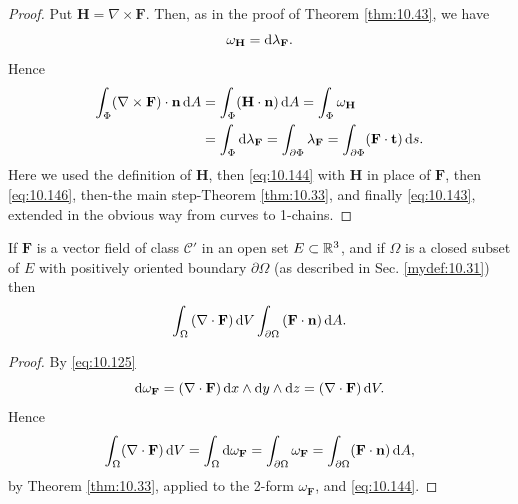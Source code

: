 \begin{proof}
    Put $\mathbf{H} = \nabla \times \mathbf{F}$.
    Then, as in the proof of Theorem \ref{thm:10.43},
    we have 
    \begin{equation}
        \label{eq:10.146}
        \omega_{\mathbf{H}} = \d \lambda_{\mathbf{F}} . 
    \end{equation}
    Hence 
    \begin{align*}
        \int_{\Phi} (\nabla \times \mathbf{F}) \cdot \mathbf{n} \d A 
        &= \int_{\Phi} (\mathbf{H \cdot n}) \d A 
        = \int_{\Phi} \omega_{\mathbf{H}} \\
        &= \int_{\Phi} \d \lambda_{\mathbf{F}} 
        = \int_{\partial \Phi} \lambda_{\mathbf{F}} 
        = \int_{\partial \Phi} (\mathbf{F \cdot t}) \d s .
    \end{align*}
    Here we used the definition of $\mathbf{H}$, 
    then \eqref{eq:10.144} with $\mathbf{H}$ in place of $\mathbf{F}$, 
    then \eqref{eq:10.146}, then-the main step-Theorem \ref{thm:10.33}, 
    and finally \eqref{eq:10.143}, extended in the obvious way from curves to 1-chains.
\end{proof}

\begin{thm}
    \label{thm:10.51}
    If $\mathbf{F}$ is a vector field of class $\mathscr{C}'$ in an open set $E \subset {\protect\mathbb R}^3$, 
    and if $\Omega$ is a closed subset of $E$ with positively oriented boundary $\partial \Omega$ (as described in Sec. \ref{mydef:10.31}) then
    \begin{equation}
        \label{eq:10.147}
        \int_{\Omega} \left( \nabla \cdot \mathbf{F} \right) \d V 
        \int_{\partial \Omega} \left( \mathbf{F} \cdot \mathbf{n} \right) \d A . 
    \end{equation}
\end{thm}

\begin{proof}
    By \eqref{eq:10.125}
    \begin{equation*}
        \d \omega_{\mathbf{F}} = 
        (\nabla \cdot \mathbf{F}) \d x \wedge \d y \wedge \d z = 
        (\nabla \cdot \mathbf{F}) \d V .
    \end{equation*}
    Hence 
    \begin{equation*}
        \int_{\Omega} (\nabla \cdot \mathbf{F}) \d V
        = \int_{\Omega} \d \omega_{\mathbf{F}} 
        = \int_{\partial \Omega} \omega_{\mathbf{F}} 
        = \int_{\partial \Omega} (\mathbf{F \cdot n}) \d A ,
    \end{equation*}
    by Theorem \ref{thm:10.33}, 
    applied to the 2-form $\omega_{\mathbf{F}}$, and \eqref{eq:10.144}.
\end{proof}
